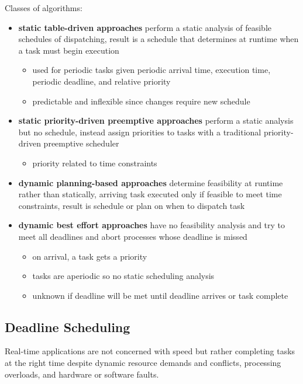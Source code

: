 \documentclass[11pt]{article}
\begin{document}
Classes of algorithms:
\begin{itemize}
\item \textbf{static table-driven approaches} perform a static analysis of feasible schedules of dispatching, result is a schedule
that determines at runtime when a task must begin execution
\begin{itemize}
\item used for periodic tasks given periodic arrival time, execution time, periodic deadline, and relative priority
\item predictable and inflexible since changes require new schedule
\end{itemize}
\item \textbf{static priority-driven preemptive approaches} perform a static analysis but no schedule, instead assign priorities to
tasks with a traditional priority-driven preemptive scheduler
\begin{itemize}
\item priority related to time constraints
\end{itemize}
\item \textbf{dynamic planning-based approaches} determine feasibility at runtime rather than statically, arriving task executed only if
feasible to meet time constraints, result is schedule or plan on when to dispatch task
\item \textbf{dynamic best effort approaches} have no feasibility analysis and try to meet all deadlines and abort processes whose deadline
is missed
\begin{itemize}
\item on arrival, a task gets a priority
\item tasks are aperiodic so no static scheduling analysis
\item unknown if deadline will be met until deadline arrives or task complete
\end{itemize}
\end{itemize}
\subsection{Deadline Scheduling}
\label{sec:orge3726ec}
Real-time applications are not concerned with speed but rather completing tasks at the right time despite dynamic resource
demands and conflicts, processing overloads, and hardware or software faults.
\end{document}
